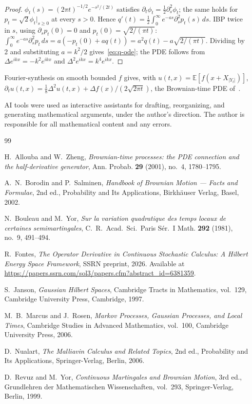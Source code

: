 \documentclass[EJP]{ejpecp}
\renewcommand{\E}{\mathbb{E}}
\begin{document}
\begin{proof}
$\phi_t(s)=(2\pi t)^{-1/2}e^{-s^{2}/(2t)}$ satisfies
$\partial_t\phi_t=\tfrac12\partial_s^{2}\phi_t$; the same holds for
$p_t=\sqrt 2\phi_t|_{s\ge 0}$ at every $s>0$. Hence
$q'(t)=\tfrac12\!\int_0^\infty e^{-as}\partial_s^{2}p_t(s)\,ds$.
IBP twice in $s$, using $\partial_s p_t(0)=0$ and $p_t(0)=\sqrt{2/(\pi t)}$:
$\int_0^\infty e^{-as}\partial_s^{2}p_t\,ds=a(-p_t(0)+aq(t))=a^{2}q(t)-a\sqrt{2/(\pi t)}$.
Dividing by 2 and substituting $a=k^{2}/2$ gives~\eqref{eq:q-ode};
the PDE follows from $\Delta e^{ikx}=-k^{2}e^{ikx}$ and
$\Delta^{2}e^{ikx}=k^{4}e^{ikx}$.
\end{proof}

Fourier-synthesis on smooth bounded $f$ gives, with $u(t,x)=\E[f(x+X_{|Y_t|})]$,
$\partial_t u(t,x)=\tfrac18\Delta^{2}u(t,x)+\Delta f(x)/(2\sqrt{2\pi t})$,
the Brownian-time PDE of~\cite{AllouZheng}.

\begin{acks}
AI tools were used as interactive assistants for drafting,
reorganizing, and generating mathematical arguments, under the
author's direction. The author is responsible for all mathematical
content and any errors.
\end{acks}

\begin{thebibliography}{99}

H.~Allouba and W.~Zheng,
\emph{Brownian-time processes: the PDE connection and the
half-derivative generator},
Ann. Probab. \textbf{29} (2001), no.~4, 1780--1795.

A.~N.~Borodin and P.~Salminen,
\emph{Handbook of Brownian Motion --- Facts and Formulae},
2nd ed., Probability and Its Applications,
Birkh\"auser Verlag, Basel, 2002.

N.~Bouleau and M.~Yor,
\emph{Sur la variation quadratique des temps locaux de certaines
semimartingales},
C.~R.~Acad.~Sci.~Paris S\'er.~I Math. \textbf{292} (1981), no.~9,
491--494.

R.~Fontes,
\emph{The Operator Derivative in Continuous Stochastic Calculus:
A Hilbert Energy Space Framework},
SSRN preprint, 2026.
Available at \url{https://papers.ssrn.com/sol3/papers.cfm?abstract_id=6381359}.

S.~Janson,
\emph{Gaussian Hilbert Spaces},
Cambridge Tracts in Mathematics, vol.~129,
Cambridge University Press, Cambridge, 1997.

M.~B.~Marcus and J.~Rosen,
\emph{Markov Processes, Gaussian Processes, and Local Times},
Cambridge Studies in Advanced Mathematics, vol.~100,
Cambridge University Press, 2006.

D.~Nualart,
\emph{The Malliavin Calculus and Related Topics},
2nd ed., Probability and Its Applications,
Springer-Verlag, Berlin, 2006.

D.~Revuz and M.~Yor,
\emph{Continuous Martingales and Brownian Motion},
3rd ed., Grundlehren der Mathematischen Wissenschaften, vol.~293,
Springer-Verlag, Berlin, 1999.

\end{thebibliography}
\end{document}
